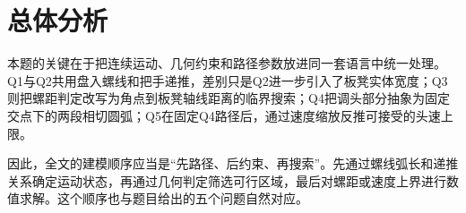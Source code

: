 \section{总体分析}
本题的关键在于把连续运动、几何约束和路径参数放进同一套语言中统一处理。Q1与Q2共用盘入螺线和把手递推，差别只是Q2进一步引入了板凳实体宽度；Q3则把螺距判定改写为角点到板凳轴线距离的临界搜索；Q4把调头部分抽象为固定交点下的两段相切圆弧；Q5在固定Q4路径后，通过速度缩放反推可接受的头速上限。

因此，全文的建模顺序应当是“先路径、后约束、再搜索”。先通过螺线弧长和递推关系确定运动状态，再通过几何判定筛选可行区域，最后对螺距或速度上界进行数值求解。这个顺序也与题目给出的五个问题自然对应。
